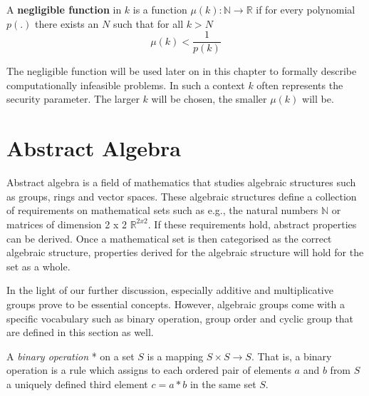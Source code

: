 \begin{defn}
\label{def:negligible_function}
A \textbf{negligible function} in $k$ is a function $\mu \left( k \right): \mathbb{N} \rightarrow \mathbb{R}$ if for every polynomial $p \left( . \right)$ there exists an $N$ such that for all $k > N$~\cite{book:Goldreich97}
 \begin{equation*}
  \mu \left( k \right) < \frac{1}{p\left( k \right)} 
 \end{equation*}
\end{defn}

The negligible function will be used later on in this chapter to formally describe computationally infeasible problems. In such a context $k$ often represents the security parameter. The larger $k$ will be chosen, the smaller $\mu \left( k \right)$ will be.

\section{Abstract Algebra}
Abstract algebra is a field of mathematics that studies algebraic structures such as groups, rings and vector spaces. These algebraic structures define a collection of requirements on mathematical sets such as e.g., the natural numbers $\mathbb{N}$ or matrices of dimension 2 x 2 $\mathbb{R}^{2 x 2}$. If these requirements hold, abstract properties can be derived. Once a mathematical set is then categorised as the correct algebraic structure, properties derived for the algebraic structure will hold for the set as a whole.

In the light of our further discussion, especially additive and multiplicative groups prove to be essential concepts. However, algebraic groups come with a specific vocabulary such as binary operation, group order and cyclic group that are defined in this section as well.

\begin{defn}
 A \textit{binary operation} * on a set $S$ is a mapping $S \times S \rightarrow S$. That is, a binary operation is a rule which assigns to each ordered pair of elements $a$ and $b$ from $S$ a uniquely defined third element $c = a*b$ in the same set $S$.~\cite{book:handbook_of_applied_cryptography,book:survey_of_modern_algebra}
\end{defn}


